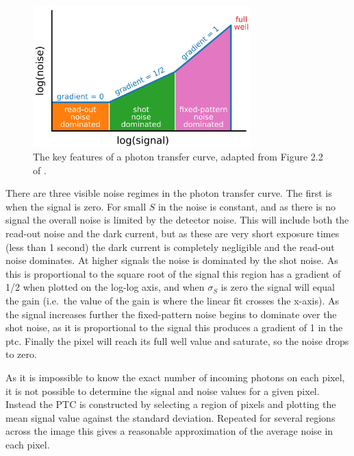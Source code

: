 \begin{colsection}
\begin{colsection}
\begin{figure}[t]
    \begin{center}
        \includegraphics[width=0.75\textwidth]{images/ptc.pdf}
    \end{center}
    \caption[Key features of the photon transfer curve]{
        The key features of a photon transfer curve, adapted from Figure 2.2 of \citet{CCDs}.
    }\label{fig:ptc_cartoon}
\end{figure}

There are three visible noise regimes in the photon transfer curve. The first is when the signal is zero. For small $S$ in  the noise is constant, and as there is no signal the overall noise is limited by the detector noise. This will include both the read-out noise and the dark current, but as these are very short exposure times (less than 1 second) the dark current is completely negligible and the read-out noise dominates. At higher signals the noise is dominated by the shot noise. As this is proportional to the square root of the signal this region has a gradient of 1/2 when plotted on the log-log axis, and when $\sigma_S$ is zero the signal will equal the gain (i.e.\ the value of the gain is where the linear fit crosses the x-axis). As the signal increases further the fixed-pattern noise begins to dominate over the shot noise, as it is proportional to the signal this produces a gradient of 1 in the \gls{ptc}. Finally the pixel will reach its full well value and saturate, so the noise drops to zero.

As it is impossible to know the exact number of incoming photons on each pixel, it is not possible to determine the signal and noise values for a given pixel. Instead the PTC is constructed by selecting a region of pixels and plotting the mean signal value against the standard deviation. Repeated for several regions across the image this gives a reasonable approximation of the average noise in each pixel.


\end{colsection}
\end{colsection}
